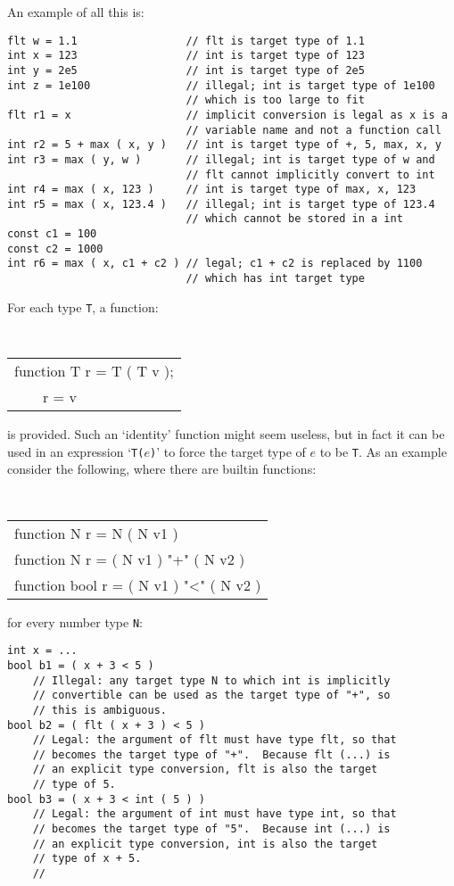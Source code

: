 \documentclass[12pt]{article}
\newenvironment{indpar}[1][0.3in]%
	{\begin{list}{}%
		     {\setlength{\itemsep}{0in}%
		      \setlength{\topsep}{0in}%
		      \setlength{\parsep}{1ex}%
		      \setlength{\labelwidth}{#1}%
		      \setlength{\leftmargin}{#1}%
		      \addtolength{\leftmargin}{\labelsep}}%
	 \item}%
	{\end{list}}
\begin{document}
An example of all this is:

\begin{indpar}\begin{verbatim}
flt w = 1.1                 // flt is target type of 1.1
int x = 123                 // int is target type of 123
int y = 2e5                 // int is target type of 2e5
int z = 1e100               // illegal; int is target type of 1e100
                            // which is too large to fit
flt r1 = x                  // implicit conversion is legal as x is a
                            // variable name and not a function call
int r2 = 5 + max ( x, y )   // int is target type of +, 5, max, x, y
int r3 = max ( y, w )       // illegal; int is target type of w and
                            // flt cannot implicitly convert to int
int r4 = max ( x, 123 )     // int is target type of max, x, 123
int r5 = max ( x, 123.4 )   // illegal; int is target type of 123.4
                            // which cannot be stored in a int
const c1 = 100
const c2 = 1000
int r6 = max ( x, c1 + c2 ) // legal; c1 + c2 is replaced by 1100
                            // which has int target type
\end{verbatim}\end{indpar}

For each type {\tt T}, a function:
\begin{center} \tt
\begin{tabular}{l}
function T r = T ( T v ); \\
~~~~r = v
\end{tabular}
\end{center}
is provided.  Such an `identity' function might seem useless,
but in fact it can be used in an expression `{\tt T($e$)}' to
force the target type of $e$ to be {\tt T}.  As an example
consider the following, where there are builtin functions:
\begin{center} \tt
\begin{tabular}{l}
function N r = N ( N v1 ) \\
function N r = ( N v1 ) "+" ( N v2 ) \\
function bool r = ( N v1 ) "<" ( N v2 ) \\
\end{tabular}
\end{center}
for every number type {\tt N}:

\begin{indpar}\begin{verbatim}
int x = ...
bool b1 = ( x + 3 < 5 )
    // Illegal: any target type N to which int is implicitly
    // convertible can be used as the target type of "+", so
    // this is ambiguous.
bool b2 = ( flt ( x + 3 ) < 5 )
    // Legal: the argument of flt must have type flt, so that
    // becomes the target type of "+".  Because flt (...) is
    // an explicit type conversion, flt is also the target
    // type of 5.
bool b3 = ( x + 3 < int ( 5 ) )
    // Legal: the argument of int must have type int, so that
    // becomes the target type of "5".  Because int (...) is
    // an explicit type conversion, int is also the target
    // type of x + 5.
    // 
\end{verbatim}\end{indpar}
\end{document}
